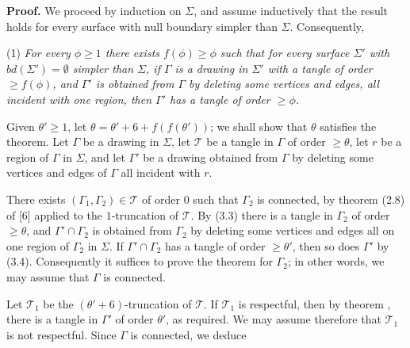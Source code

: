 \textbf{Proof.} We proceed by induction on $\Sigma$, and assume inductively that the result holds for every surface with null boundary simpler than $\Sigma$. Consequently,

\hspace*{12pt}(1) \textit{For every $\phi \ge 1$ there exists $f(\phi) \ge \phi$ such that for every surface $\Sigma'$ with $bd(\Sigma') = \emptyset$ simpler than $\Sigma$, if $\Gamma$ is a drawing in $\Sigma'$ with a tangle of order $\ge f(\phi)$, and $\Gamma'$ is obtained from $\Gamma$ by deleting some vertices and edges, all incident with one region, then $\Gamma'$ has a tangle of order $\ge \phi$.}

Given $\theta' \ge 1$, let $\theta = \theta' + 6 + f(f(\theta'))$; we shall show that $\theta$ satisfies the theorem. Let $\Gamma$ be a drawing in $\Sigma$, let $\mathcal{T}$ be a tangle in $\Gamma$ of order $\ge \theta$, let $r$ be a region of $\Gamma$ in $\Sigma$, and let $\Gamma'$ be a drawing obtained from $\Gamma$ by deleting some vertices and edges of $\Gamma$ all incident with $r$.

There exists $(\Gamma_1, \Gamma_2) \in \mathcal{T}$ of order $0$ such that $\Gamma_2$ is connected, by theorem (2.8) of [6] applied to the $1$-truncation of $\mathcal{T}$. By (3.3) there is a tangle in $\Gamma_2$ of order $\ge \theta$, and $\Gamma' \cap \Gamma_2$ is obtained from $\Gamma_2$ by deleting some vertices and edges all on one region of $\Gamma_2$ in $\Sigma$. If $\Gamma' \cap \Gamma_2$ has a tangle of order $\ge \theta'$, then so does $\Gamma'$ by (3.4). Consequently it suffices to prove the theorem for $\Gamma_2$; in other words, we may assume that $\Gamma$ is connected.

Let $\mathcal{T}_1$ be the $(\theta' + 6)$-truncation of $\mathcal{T}$. If $\mathcal{T}_1$ is respectful, then by theorem , there is a tangle in $\Gamma'$ of order $\theta'$, as required. We may assume therefore that $\mathcal{T}_1$ is not respectful. Since $\Gamma$ is connected, we deduce

